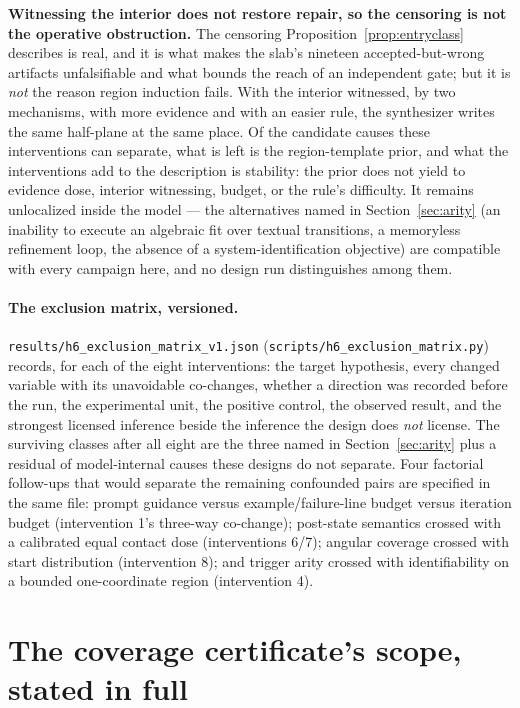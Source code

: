 \documentclass[11pt]{article}
\theoremstyle{definition}
\theoremstyle{remark}
\begin{document}
\textbf{Witnessing the interior does not restore repair, so the censoring is not the operative obstruction.} The censoring Proposition~\ref{prop:entryclass} describes is real, and it is what makes the slab's nineteen accepted-but-wrong artifacts unfalsifiable and what bounds the reach of an independent gate; but it is \emph{not} the reason region induction fails. With the interior witnessed, by two mechanisms, with more evidence and with an easier rule, the synthesizer writes the same half-plane at the same place. Of the candidate causes these interventions can separate, what is left is the region-template prior, and what the interventions add to the description is stability: the prior does not yield to evidence dose, interior witnessing, budget, or the rule's difficulty. It remains unlocalized inside the model --- the alternatives named in Section~\ref{sec:arity} (an inability to execute an algebraic fit over textual transitions, a memoryless refinement loop, the absence of a system-identification objective) are compatible with every campaign here, and no design run distinguishes among them.

\paragraph{The exclusion matrix, versioned.} \texttt{results/\allowbreak h6\_\allowbreak exclusion\_\allowbreak matrix\_\allowbreak v1.json} (\texttt{scripts/\allowbreak h6\_\allowbreak exclusion\_\allowbreak matrix.py}) records, for each of the eight interventions: the target hypothesis, every changed variable with its unavoidable co-changes, whether a direction was recorded before the run, the experimental unit, the positive control, the observed result, and the strongest licensed inference beside the inference the design does \emph{not} license. The surviving classes after all eight are the three named in Section~\ref{sec:arity} plus a residual of model-internal causes these designs do not separate. Four factorial follow-ups that would separate the remaining confounded pairs are specified in the same file: prompt guidance versus example/failure-line budget versus iteration budget (intervention 1's three-way co-change); post-state semantics crossed with a calibrated equal contact dose (interventions 6/7); angular coverage crossed with start distribution (intervention 8); and trigger arity crossed with identifiability on a bounded one-coordinate region (intervention 4).

\section{The coverage certificate's scope, stated in full}
\label{sup:certscope}
\end{document}
